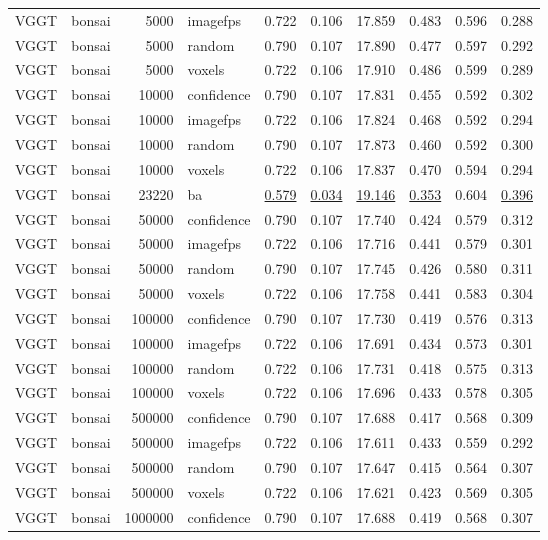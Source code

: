 \begin{table}[H]
\begin{tabular}{llrlrrrrrr}
VGGT & bonsai & 5000 & imagefps & 0.722 & 0.106 & 17.859 & 0.483 & 0.596 & 0.288 \\
VGGT & bonsai & 5000 & random & 0.790 & 0.107 & 17.890 & 0.477 & 0.597 & 0.292 \\
VGGT & bonsai & 5000 & voxels & 0.722 & 0.106 & 17.910 & 0.486 & 0.599 & 0.289 \\
VGGT & bonsai & 10000 & confidence & 0.790 & 0.107 & 17.831 & 0.455 & 0.592 & 0.302 \\
VGGT & bonsai & 10000 & imagefps & 0.722 & 0.106 & 17.824 & 0.468 & 0.592 & 0.294 \\
VGGT & bonsai & 10000 & random & 0.790 & 0.107 & 17.873 & 0.460 & 0.592 & 0.300 \\
VGGT & bonsai & 10000 & voxels & 0.722 & 0.106 & 17.837 & 0.470 & 0.594 & 0.294 \\
VGGT & bonsai & 23220 & ba & \underline{0.579} & \underline{0.034} & \underline{19.146} & \underline{0.353} & 0.604 & \underline{0.396} \\
VGGT & bonsai & 50000 & confidence & 0.790 & 0.107 & 17.740 & 0.424 & 0.579 & 0.312 \\
VGGT & bonsai & 50000 & imagefps & 0.722 & 0.106 & 17.716 & 0.441 & 0.579 & 0.301 \\
VGGT & bonsai & 50000 & random & 0.790 & 0.107 & 17.745 & 0.426 & 0.580 & 0.311 \\
VGGT & bonsai & 50000 & voxels & 0.722 & 0.106 & 17.758 & 0.441 & 0.583 & 0.304 \\
VGGT & bonsai & 100000 & confidence & 0.790 & 0.107 & 17.730 & 0.419 & 0.576 & 0.313 \\
VGGT & bonsai & 100000 & imagefps & 0.722 & 0.106 & 17.691 & 0.434 & 0.573 & 0.301 \\
VGGT & bonsai & 100000 & random & 0.722 & 0.106 & 17.731 & 0.418 & 0.575 & 0.313 \\
VGGT & bonsai & 100000 & voxels & 0.722 & 0.106 & 17.696 & 0.433 & 0.578 & 0.305 \\
VGGT & bonsai & 500000 & confidence & 0.790 & 0.107 & 17.688 & 0.417 & 0.568 & 0.309 \\
VGGT & bonsai & 500000 & imagefps & 0.722 & 0.106 & 17.611 & 0.433 & 0.559 & 0.292 \\
VGGT & bonsai & 500000 & random & 0.790 & 0.107 & 17.647 & 0.415 & 0.564 & 0.307 \\
VGGT & bonsai & 500000 & voxels & 0.722 & 0.106 & 17.621 & 0.423 & 0.569 & 0.305 \\
VGGT & bonsai & 1000000 & confidence & 0.790 & 0.107 & 17.688 & 0.419 & 0.568 & 0.307 \\

\end{tabular}
\end{table}
